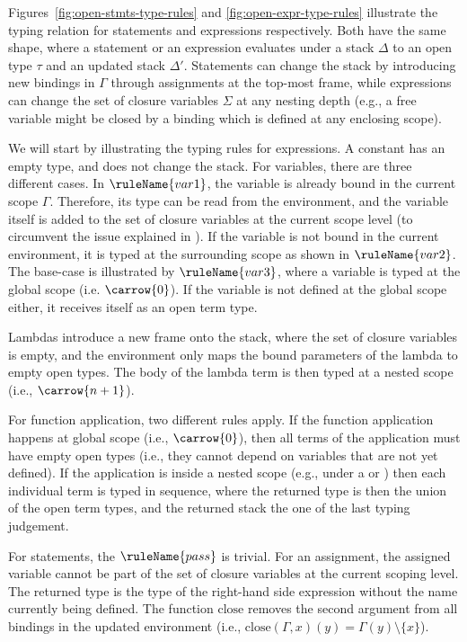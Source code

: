 Figures~\ref{fig:open-stmts-type-rules} and \ref{fig:open-expr-type-rules} illustrate the typing relation for statements
and expressions respectively. Both have the same shape, where a statement or an expression evaluates under a
stack $\Delta$ to an open type $\tau$ and an updated stack $\Delta'$. Statements can change the stack by introducing
new bindings in $\Gamma$ through assignments at the top-most frame, while expressions can change the set of closure 
variables $\Sigma$ at any nesting depth (e.g., a free variable might be closed by a binding which is defined at any 
enclosing scope).

We will start by illustrating the typing rules for expressions. A constant has an empty type, and does not change
the stack. For variables, there are three different cases. In $\ruleName{var1}$, the variable is
already bound in the current scope $\Gamma$. Therefore, its type can be read from the environment, and the
variable itself is added to the set of closure variables at the current scope level (to circumvent the issue explained in
). If the variable is not bound in the current environment, it is typed at the
surrounding scope as shown in $\ruleName{var2}$. The base-case is illustrated by $\ruleName{var3}$, where a variable
is typed at the global scope (i.e. $\carrow{0}$). If the variable is not defined at the global scope either, it receives
itself as an open term type.

Lambdas introduce a new frame onto the stack, where the set of closure variables is empty, and the environment only
maps the bound parameters of the lambda to empty open types. The body of the lambda term is then typed at a nested
scope (i.e., $\carrow{n+1}$).

For function application, two different rules apply. If the function application happens at global scope (i.e.,
$\carrow{0}$), then all terms of the application must have empty open types (i.e., they cannot depend on variables
that are not yet defined). If the application is inside a nested scope (e.g., under a  or )
then each individual term is typed in sequence, where the returned type is then the union of the open term types, and
the returned stack the one of the last typing judgement.

For statements, the $\ruleName{pass}$ is trivial. For an assignment, the assigned variable cannot be part of the set of
closure variables at the current scoping level. The returned type is the type of the right-hand side expression without
the name currently being defined. The function $\mathrm{close}$ removes the second argument from all bindings in the
updated environment (i.e., $\mathrm{close}(\Gamma, x)(y) = \Gamma(y) \setminus \{x\}$).

